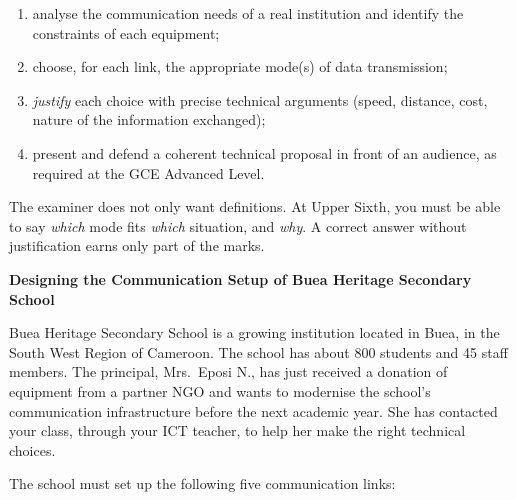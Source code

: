 \documentclass[11pt]{article}
\newcounter{popsec}
\newcounter{popsub}
\newcommand{\courssub}[1]{%
  \stepcounter{popsub}%
  \par\vspace{9pt}\noindent{\popxbold\fontsize{11.5}{13}\selectfont\color{popink}{\color{poporange}\thepopsec.\thepopsub}\hspace{6pt}#1}\par\nopagebreak\vspace{4pt}
}
\begin{document}
\begin{enumerate}
\item analyse the communication needs of a real institution and identify the constraints of each equipment;
\item choose, for each link, the appropriate mode(s) of data transmission;
\item \emph{justify} each choice with precise technical arguments (speed, distance, cost, nature of the information exchanged);
\item present and defend a coherent technical proposal in front of an audience, as required at the GCE Advanced Level.
\end{enumerate}

\begin{aretenir}
The examiner does not only want definitions. At Upper Sixth, you must be able to say \emph{which} mode fits \emph{which} situation, and \emph{why}. A correct answer without justification earns only part of the marks.
\end{aretenir}

\courssub{Situation}

\textbf{Designing the Communication Setup of Buea Heritage Secondary School}

Buea Heritage Secondary School is a growing institution located in Buea, in the South West Region of Cameroon. The school has about 800 students and 45 staff members. The principal, Mrs.\ Eposi N., has just received a donation of equipment from a partner NGO and wants to modernise the school's communication infrastructure before the next academic year. She has contacted your class, through your ICT teacher, to help her make the right technical choices.

The school must set up the following five communication links:
\end{document}
